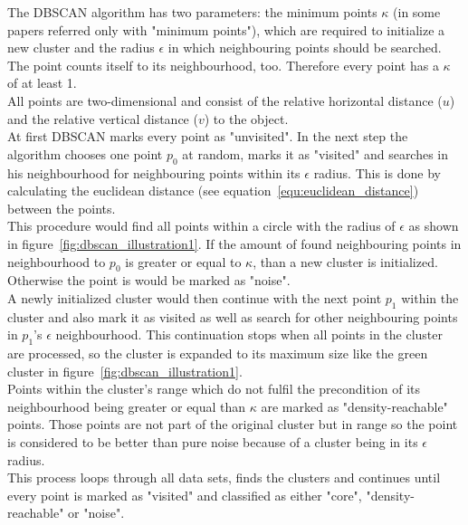 \documentclass[lnicst,a4paper]{svmultln}
\begin{document}
The DBSCAN algorithm has two parameters: the minimum points $\kappa$ (in some papers referred only with "minimum points"), which are required to initialize a new cluster and the radius $\epsilon$ in which neighbouring points should be searched.
\\
The point counts itself to its neighbourhood, too. Therefore every point has a $\kappa$ of at least 1.
\\
All points are two-dimensional and consist of the relative horizontal distance ($u$) and the relative vertical distance ($v$) to the object.
\\
At first DBSCAN marks every point as "unvisited". In the next step the algorithm chooses one point $p_0$ at random, marks it as "visited" and searches in his neighbourhood for neighbouring points within its $\epsilon$ radius. This is done by calculating the euclidean distance (see equation~\ref{equ:euclidean_distance}) between the points.
\\
This procedure would find all points within a circle with the radius of $\epsilon$ as shown in figure~\ref{fig:dbscan_illustration1}. If the amount of found neighbouring points in neighbourhood to $p_0$ is greater or equal to $\kappa$, than a new cluster is initialized. Otherwise the point is would be marked as "noise".
\\
A newly initialized cluster would then continue with the next point $p_1$ within the cluster and also mark it as visited as well as search for other neighbouring points in $p_1$'s $\epsilon$ neighbourhood. This continuation stops when all points in the cluster are processed, so the cluster is expanded to its maximum size like the green cluster in figure~\ref{fig:dbscan_illustration1}.
\\
Points within the cluster's range which do not fulfil the precondition of its neighbourhood being greater or equal than $\kappa$ are marked as "density-reachable" points. Those points are not part of the original cluster but in range so the point is considered to be better than pure noise because of a cluster being in its $\epsilon$ radius.
\\
This process loops through all data sets, finds the clusters and continues until every point is marked as "visited" and classified as either "core", "density-reachable" or "noise".
\end{document}
